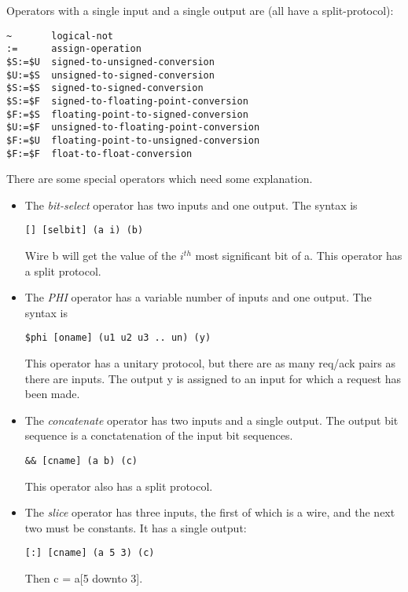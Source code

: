 \documentclass{article}
\begin{document}
Operators with a single input and a single
output are (all have a split-protocol):
\begin{verbatim}
~       logical-not
:=      assign-operation
$S:=$U  signed-to-unsigned-conversion
$U:=$S  unsigned-to-signed-conversion
$S:=$S  signed-to-signed-conversion
$S:=$F  signed-to-floating-point-conversion
$F:=$S  floating-point-to-signed-conversion
$U:=$F  unsigned-to-floating-point-conversion
$F:=$U  floating-point-to-unsigned-conversion
$F:=$F  float-to-float-conversion
\end{verbatim}

There are some special operators which
need some explanation.
\begin{itemize}
\item The {\em bit-select} operator has two inputs and
one output.  The syntax is
\begin{verbatim}
[] [selbit] (a i) (b)
\end{verbatim}
Wire b will get the value of the $i^{th}$ most significant bit
of a.  This operator has a split protocol. 
\item  The {\em PHI} operator has a variable number of inputs
and one output.  The syntax is
\begin{verbatim}
$phi [oname] (u1 u2 u3 .. un) (y)
\end{verbatim}
This operator has a unitary protocol, but there are as many
req/ack pairs as there are inputs.  The output y
is assigned to an input for which a request has been made.
\item The {\em concatenate} operator has two inputs and a single
output.  The output bit sequence is a conctatenation of the input
bit sequences.
\begin{verbatim}
&& [cname] (a b) (c)
\end{verbatim}
This operator also has a split protocol.
\item The {\em slice} operator has three inputs, the first
of which is a wire, and the next two must be constants.
It has a single output:
\begin{verbatim}
[:] [cname] (a 5 3) (c)
\end{verbatim}
Then c = a[5 downto 3].
\end{itemize} 
\end{document}
